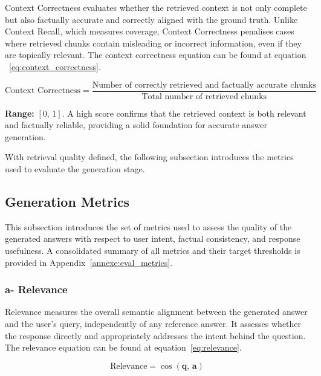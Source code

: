 Context Correctness evaluates whether the retrieved context is not only
complete but also factually accurate and correctly aligned with the
ground truth. Unlike Context Recall, which measures coverage, Context
Correctness penalises cases where retrieved chunks contain misleading
or incorrect information, even if they are topically relevant.
The context correctness equation can be found at equation ~\ref{eq:context_correctness}.

\begin{equation}
\text{Context Correctness} =
\frac{\text{Number of correctly retrieved and factually accurate chunks}}
     {\text{Total number of retrieved chunks}}
\label{eq:context_correctness}
\end{equation}

\textbf{Range:} $[0,\,1]$. A high score confirms that the retrieved
context is both relevant and factually reliable, providing a solid
foundation for accurate answer generation.

With retrieval quality defined, the following subsection introduces the
metrics used to evaluate the generation stage.

\subsection{Generation Metrics}

This subsection introduces the set of metrics used to assess the quality
of the generated answers with respect to user intent, factual consistency,
and response usefulness. A consolidated summary of all metrics and their target thresholds
is provided in Appendix~\ref{annexe:eval_metrics}.

\subsubsection{a- Relevance}

Relevance measures the overall semantic alignment between the generated
answer and the user's query, independently of any reference answer.
It assesses whether the response directly and appropriately addresses
the intent behind the question.
The relevance equation can be found at equation~\ref{eq:relevance}.

\begin{equation}
\text{Relevance} =
\cos\!\left(\mathbf{q},\, \mathbf{a}\right)
\label{eq:relevance}
\end{equation}

